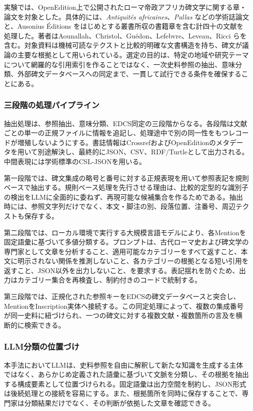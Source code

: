 実験では、OpenEdition上で公開されたローマ帝政アフリカ碑文学に関する章・論文を対象とした。具体的には、\textit{Antiquités africaines}、\textit{Pallas} などの学術誌論文と、Ausonius Éditions をはじめとする叢書所収の書籍章を含む計四十の文献を処理した。著者はAounallah、Christol、Guédon、Lefebvre、Leveau、Ricci らを含む。対象資料は機械可読なテクストと比較的明確な文書構造を持ち、碑文が議論の主要な根拠として用いられている。選定の目的は、特定の地域や研究テーマについて網羅的な引用索引を作ることではなく、一次史料参照の抽出、意味分類、外部碑文データベースへの同定まで、一貫して試行できる条件を確保することにある。

\subsubsection{三段階の処理パイプライン}

抽出処理は、参照抽出、意味分類、EDCS同定の三段階からなる。各段階は文献ごとの単一の正規ファイルに情報を追記し、処理途中で別の同一性をもつレコードが増殖しないようにする。書誌情報はCrossrefおよびOpenEditionのメタデータを用いて別途解決し、最終的にJSON、CSV、RDF/Turtleとして出力される。中間表現には学術標準のCSL-JSONを用いる。

第一段階では、碑文集成の略号と番号に対する正規表現を用いて参照表記を規則ベースで抽出する。規則ベース処理を先行させる理由は、比較的定型的な識別子の検出をLLMに全面的に委ねず、再現可能な候補集合を作るためである。抽出時には、参照文字列だけでなく、本文・脚注の別、段落位置、注番号、周辺テクストも保存する。

第二段階では、ローカル環境で実行する大規模言語モデルにより、各Mentionを固定語彙に基づいて多値分類する。プロンプトは、古代ローマ史および碑文学の専門家として文章を分析すること、適用可能なカテゴリーをすべて返すこと、本文に明示されない関係を推測しないこと、各カテゴリーの根拠となる短い引用を返すこと、JSON以外を出力しないこと、を要求する。表記揺れを防ぐため、出力はカテゴリー集合を再検査し、制約付きのコードで統制する。

第三段階では、正規化された参照キーをEDCSの碑文データベースと突合し、MentionをInscription実体へ接続する。この同定処理によって、複数の集成番号が同一史料に紐づけられ、一つの碑文に対する複数文献・複数箇所の言及を横断的に検索できる。

\subsubsection{LLM分類の位置づけ}

本手法においてLLMは、史料参照を自由に解釈して新たな知識を生成する主体ではなく、あらかじめ定義された語彙に基づいて文脈を分類し、その根拠を抽出する構成要素として位置づけられる。固定語彙は出力空間を制約し、JSON形式は後続処理との接続を容易にする。また、根拠箇所を同時に保存することで、専門家は分類結果だけでなく、その判断が依拠した文章を確認できる。

